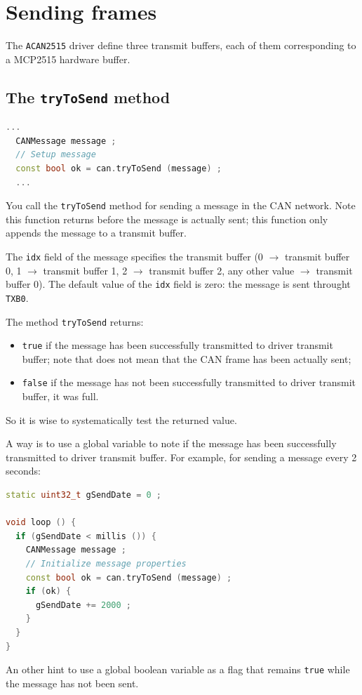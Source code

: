 \documentclass[10pt, a4paper, obeyspaces]{extarticle}
\newcommand \sectionLabel[2]{\section{#1}\label{sec:#2}}
\newcommand \subsectionLabel[2]{\subsection{#1}\label{subsec:#2}}
\begin{document}
\sectionLabel{Sending frames}{sendingFrames}

The \texttt{ACAN2515} driver define three transmit buffers, each of them corresponding to a MCP2515 hardware buffer.

\subsectionLabel{The \texttt{tryToSend} method}{tryToSendMethod}

{\small\begin{lstlisting}[language=c++]
  ...
  CANMessage message ;
  // Setup message
  const bool ok = can.tryToSend (message) ;
  ...
\end{lstlisting}}

You call the \texttt{tryToSend} method for sending a message in the CAN network. Note this function returns before the message is actually sent; this function only appends the message to a transmit buffer.

The \texttt{idx} field of the message specifies the transmit buffer (0 $\rightarrow$ transmit buffer 0, 1 $\rightarrow$ transmit buffer 1, 2 $\rightarrow$ transmit buffer 2, any other value $\rightarrow$ transmit buffer 0). The default value of the \texttt{idx} field is zero: the message is sent throught \texttt{TXB0}.

The method \texttt{tryToSend} returns:
\begin{itemize}
  \item \texttt{true} if the message has been successfully transmitted to driver transmit buffer; note that does not mean that the CAN frame has been actually sent;
  \item \texttt{false} if the message has not been successfully transmitted to driver transmit buffer, it was full.
\end{itemize}

So it is wise to systematically test the returned value.

A way is to use a global variable to note if the message has been successfully transmitted to driver transmit buffer. For example, for sending a message every 2 seconds: 

{\small\begin{lstlisting}[language=c++]
static uint32_t gSendDate = 0 ;

void loop () {
  if (gSendDate < millis ()) {
    CANMessage message ;
    // Initialize message properties
    const bool ok = can.tryToSend (message) ;
    if (ok) {
      gSendDate += 2000 ;
    }
  }
}
\end{lstlisting}}

An other hint to use a global boolean variable as a flag that remains \texttt{true} while the message has not been sent.
\end{document}
